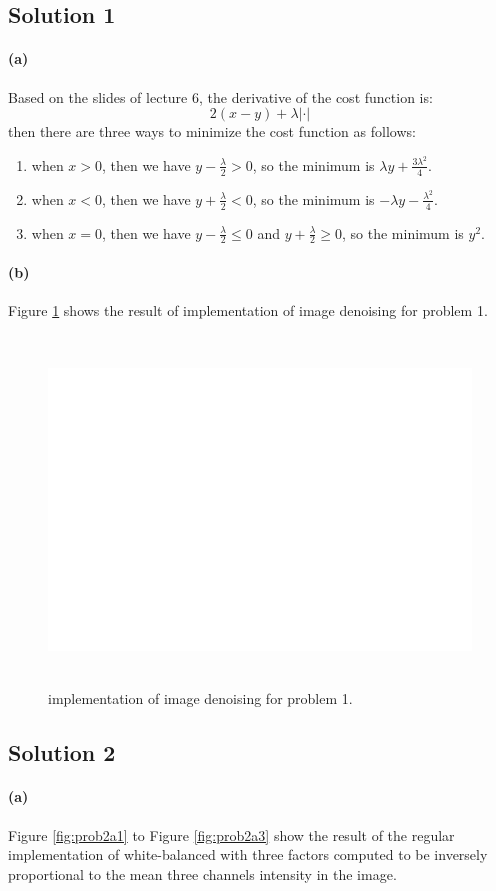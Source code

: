 \documentclass{article}
\newcommand{\solution}[1]{\clearpage \subsection*{Solution #1}}
\newcommand{\spart}[1]{\paragraph{(#1)}}
\begin{document}

\solution{1}
\spart{a} Based on the slides of lecture 6, the derivative of the cost function is:
$$
2(x - y) + \lambda|\cdot|
$$
then there are three ways to minimize the cost function as follows:
\begin{enumerate}
\item when $x > 0$, then we have $y - \frac{\lambda}{2} > 0$, so the minimum is $\lambda y + \frac{3\lambda^2}{4}$.
\item when $x < 0$, then we have $y + \frac{\lambda}{2} < 0$, so the minimum is $-\lambda y - \frac{\lambda^2}{4}$.
\item when $x = 0$, then we have $y - \frac{\lambda}{2} \le 0$ and $y + \frac{\lambda}{2} \ge 0$, so the minimum is $y^2$.
\end{enumerate}

\spart{b} Figure \ref{fig:prob1} shows the result of implementation of image denoising for problem 1.

\begin{figure}[!h]
  \centering
    \includegraphics[height=25em]{code/outputs/prob1.png}
  \caption{implementation of image denoising for problem 1.}
  \label{fig:prob1}
\end{figure}

\solution{2} 
\spart{a} Figure \ref{fig:prob2a1} to Figure \ref{fig:prob2a3} show the result of the regular implementation of white-balanced with three factors computed to be inversely proportional to the mean three channels intensity in the image.
\end{document}
